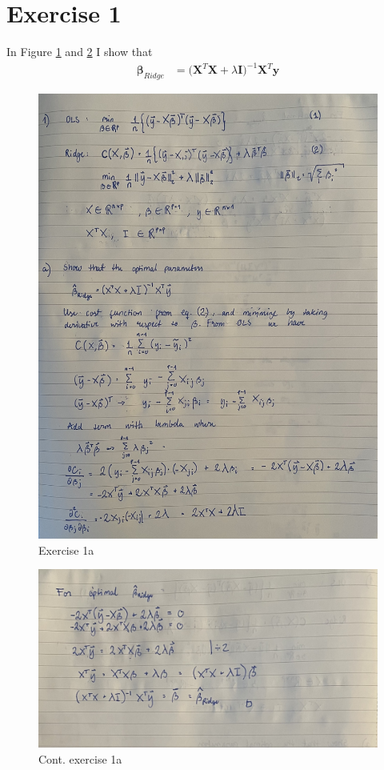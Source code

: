\section{Exercise 1}\label{sec:ex1}
In Figure \ref{fig:ex36-1} and \ref{fig:ex36-2} I show that
\begin{align*}
    \mathbf{\beta}_{Ridge} &= \big( \mathbf{X}^{T} \mathbf{X} + \lambda \mathbf{I} \big)^{-1} \mathbf{X}^{T} \mathbf{y}
\end{align*}

\begin{figure}[h!]
    \centering
    \includegraphics[width=0.7\linewidth]{latex/figures/ex36-1.jpeg}
    \caption{Exercise 1a}
    \label{fig:ex36-1}
\end{figure}

\begin{figure}[h!]
    \centering
    \includegraphics[width=0.7\linewidth]{latex/figures/ex36-2.jpeg}
    \caption{Cont. exercise 1a}
    \label{fig:ex36-2}
\end{figure}

